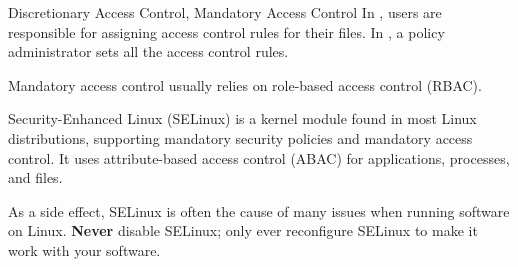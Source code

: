 \begin{dfnbox}{Discretionary Access Control, Mandatory Access Control}{}
    In , users are responsible for assigning access control rules for their files. In , a policy administrator sets all the access control rules.
\end{dfnbox}

Mandatory access control usually relies on role-based access control (RBAC).

\begin{dfnbox}{Security-Enhanced Linux (SELinux)}{}
     is a kernel module found in most Linux distributions, supporting mandatory security policies and mandatory access control. It uses attribute-based access control (ABAC) for applications, processes, and files.
\end{dfnbox}

As a side effect, SELinux is often the cause of many issues when running software on Linux. \textbf{Never} disable SELinux; only ever reconfigure SELinux to make it work with your software.
